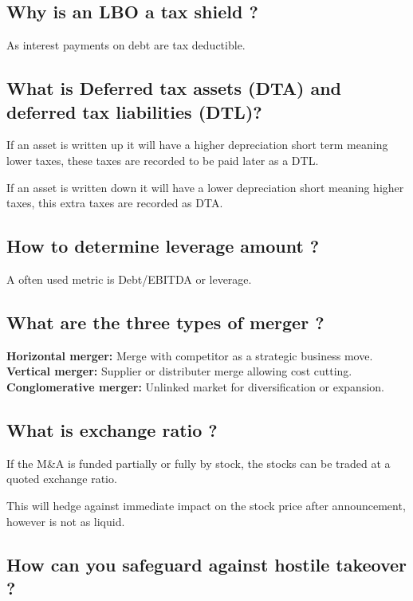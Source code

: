 \documentclass[11pt]{scrartcl} %
\begin{document}
\subsection{Why is an LBO a tax shield ?}

As interest payments on debt are tax deductible.

\subsection{What is Deferred tax assets (DTA) and deferred tax liabilities (DTL)?}

If an asset is written up it will have a higher depreciation short term meaning lower taxes, these taxes are recorded to be paid later as a DTL.

If an asset is written down it will have a lower depreciation short meaning higher taxes, this extra taxes are recorded as DTA.

\subsection{How to determine leverage amount ?}

A often used metric is Debt/EBITDA or leverage.

\subsection{What are the three types of merger ?}

\textbf{Horizontal merger:} Merge with competitor as a strategic business move.\\
\textbf{Vertical merger:} Supplier or distributer merge allowing cost cutting.\\
\textbf{Conglomerative merger:} Unlinked market for diversification or expansion.

\subsection{What is exchange ratio ?}

If the M\&A is funded partially or fully by stock, the stocks can be traded at a quoted exchange ratio.

This will hedge against immediate impact on the stock price after announcement, however is not as liquid.

\subsection{How can you safeguard against hostile takeover ?}
\end{document}
